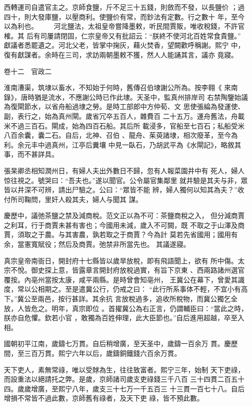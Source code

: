 \documentclass{ctexart}
\begin{document}
西轉運司自遣官主之。京師食鹽，斤不足三十五錢，則斂而不發，以長鹽价 ；過四十，則大發庫鹽，以壓商利。使鹽价有常，而鈔法有定數。行之數十 年，至今以為利也。 　　河北鹽法，太祖皇帝嘗降墨敕，听民間賈販，唯收稅錢，不許官榷。其 后有司屢請閉固，仁宗皇帝又有批詔云：``朕終不使河北百姓常食貴鹽。'' 獻議者悉罷遺之。河北父老，皆掌中掬灰，藉火焚香，望闕歡呼稱謝。熙宁 中，復有獻謀者。余時在三司，求訪兩朝墨敕不獲，然人人能誦其言，議亦 竟寢。

卷十二　官政二

淮南漕渠，筑埭以畜水，不知始于何時，舊傳召伯埭謝公所為。按李翱《 來南錄》，唐時猶是流水，不應謝公時已作此埭。天圣中，監真州排岸司 右禁陶鑒始議為復閘節水，以省舟船過埭之勞。是時工部郎中方仲荀、文 思使張綸為發運使、副，表行之，始為真州閘。歲省冗卒五百人，雜費百 二十五万。運舟舊法，舟載米不過三百石。閘成，始為四百石船。其后所 載浸多，官船至七百石；私船受米八百余囊，囊二石。自后，北神、召伯 、龍舟、茱萸諸埭，相次廢革，至今為利。余元丰中過真州，江亭后糞壤 中見一臥石，乃胡武平為《水閘記》，略敘其事，而不甚詳具。

張杲卿丞相知潤州日，有婦人夫出外數日不歸，忽有人報菜園井中有 死人，婦人惊往視之。號哭曰：``吾夫也。''遂以聞官。公令屬官集鄰里 就井驗是其夫与非，眾皆以井深不可辨，請出尸驗之。公曰：``眾皆不能 辨，婦人獨何以知其為夫？''收付所司鞠問，里奸人殺其夫，婦人与聞其 謀。

慶歷中，議弛茶鹽之禁及減商稅。范文正以為不可：茶鹽商稅之入， 但分減商賈之利耳，行于商賈未甚有害也；今國用未減，歲入不可闕，既 不取之于山澤及商賈，須取之于農。与其害農，孰若取之于商賈？今為計 莫若先省國用；國用有余，當憲寬賦役；然后及商賈。弛禁非所當先也。 其議遂寢。

真宗皇帝南衙日，開封府十七縣皆以歲旱放稅，即有飛語聞上，欲有 所中傷。太宗不悅。御史探上意，皆露章言開封府放稅過實，有旨下京東 、西兩路諸州選官覆按。內亳州當按太康，咸平兩縣。是時曾會知亳州， 王冀公在幕下，曾愛其識度，常以公相期之。至是遣冀公行，仍戒之曰： ``此行所系事体不輕，不宜小有高下。''冀公至兩邑，按行甚詳。其余抗 言放稅過多，追收所稅物，而冀公獨乞全放，人皆危之。明年，真宗即位 。首擢冀公為右正言，仍謂輔臣曰：``當此之時，朕亦自危懼。欽若小官 ，敢獨為百姓伸理，此大臣節也。''自后進用超越，卒至入相。

國朝初平江南，歲鑄七万貫。自后稍增廣，至天圣中，歲鑄一百余万 貫。慶歷間，至三百万貫。熙宁六年以后，歲鑄銅鐵錢六百余万貫。

天下吏人，素無常祿，唯以受賕為生，往往致富者。熙宁三年，始制 天下吏祿，而設重法以絕請托之弊。是歲，京師諸司歲支吏祿錢三千八百 三十四貫二百五十四。歲歲增廣，至熙宁八年，歲支三十七万一千五百三 十三貫一百七十八。自后增損不常皆不過此數，京師舊有祿者，及天下吏 祿，皆不預此數。
\end{document}
